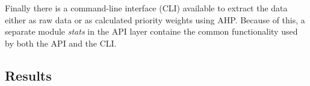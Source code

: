Finally there is a command-line interface (CLI) available to extract the data either as raw data or as calculated priority weights using AHP.
Because of this, a separate module \textit{stats} in the API layer containe the common functionality used by both the API and the CLI.

\subsection{Results}
